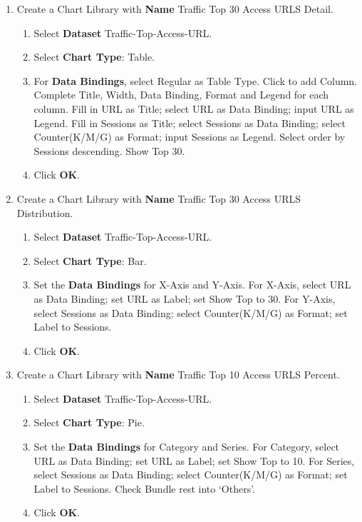 \begin{description}
\begin{enumerate}
        \item 	Create a Chart Library with \textbf{Name} Traffic Top 30 Access URLS Detail.
        \begin{enumerate}
            \item 	Select \textbf{Dataset} Traffic-Top-Access-URL.
            \item 	Select \textbf{Chart Type}: Table.
            \item 	For \textbf{Data Bindings}, select Regular as Table Type. Click to add Column. Complete Title, Width, Data Binding, Format and Legend for each column. Fill in URL as Title; select URL as Data Binding; input URL as Legend. Fill in Sessions as Title; select Sessions as Data Binding; select Counter(K/M/G) as Format; input Sessions as Legend. Select order by Sessions descending. Show Top 30.
            \item 	Click \textbf{OK}.
        \end{enumerate}
        \item 	Create a Chart Library with \textbf{Name} Traffic Top 30 Access URLS Distribution.
        \begin{enumerate}
            \item 	Select \textbf{Dataset} Traffic-Top-Access-URL.
            \item 	Select \textbf{Chart Type}: Bar.
            \item 	Set the \textbf{Data Bindings} for X-Axis and Y-Axis. For X-Axis, select URL as Data Binding; set URL as Label; set Show Top to 30. For Y-Axis, select Sessions as Data Binding; select Counter(K/M/G) as Format; set Label to Sessions.
            \item 	Click \textbf{OK}.
        \end{enumerate}
        \item 	Create a Chart Library with \textbf{Name} Traffic Top 10 Access URLS Percent.
        \begin{enumerate}
            \item 	Select \textbf{Dataset} Traffic-Top-Access-URL.
            \item 	Select \textbf{Chart Type}: Pie.
            \item 	Set the \textbf{Data Bindings} for Category and Series. For Category, select URL as Data Binding; set URL as Label; set Show Top to 10. For Series, select Sessions as Data Binding; select Counter(K/M/G) as Format; set Label to Sessions. Check Bundle rest into ‘Others’.
            \item 	Click \textbf{OK}.

\end{enumerate}
\end{enumerate}
\end{description}
